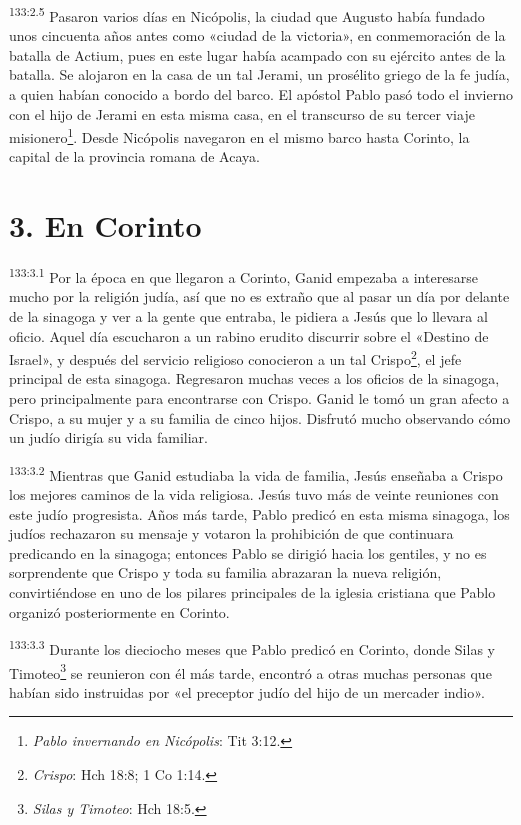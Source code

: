 \par 
\textsuperscript{133:2.5} Pasaron varios días en Nicópolis, la ciudad que Augusto había fundado unos cincuenta años antes como «ciudad de la victoria», en conmemoración de la batalla de Actium, pues en este lugar había acampado con su ejército antes de la batalla. Se alojaron en la casa de un tal Jerami, un prosélito griego de la fe judía, a quien habían conocido a bordo del barco. El apóstol Pablo pasó todo el invierno con el hijo de Jerami en esta misma casa, en el transcurso de su tercer viaje misionero\footnote{\textit{Pablo invernando en Nicópolis}: Tit 3:12.}. Desde Nicópolis navegaron en el mismo barco hasta Corinto, la capital de la provincia romana de Acaya.

\section*{3. En Corinto}
\par 
\textsuperscript{133:3.1} Por la época en que llegaron a Corinto, Ganid empezaba a interesarse mucho por la religión judía, así que no es extraño que al pasar un día por delante de la sinagoga y ver a la gente que entraba, le pidiera a Jesús que lo llevara al oficio. Aquel día escucharon a un rabino erudito discurrir sobre el «Destino de Israel», y después del servicio religioso conocieron a un tal Crispo\footnote{\textit{Crispo}: Hch 18:8; 1 Co 1:14.}, el jefe principal de esta sinagoga. Regresaron muchas veces a los oficios de la sinagoga, pero principalmente para encontrarse con Crispo. Ganid le tomó un gran afecto a Crispo, a su mujer y a su familia de cinco hijos. Disfrutó mucho observando cómo un judío dirigía su vida familiar.

\par 
\textsuperscript{133:3.2} Mientras que Ganid estudiaba la vida de familia, Jesús enseñaba a Crispo los mejores caminos de la vida religiosa. Jesús tuvo más de veinte reuniones con este judío progresista. Años más tarde, Pablo predicó en esta misma sinagoga, los judíos rechazaron su mensaje y votaron la prohibición de que continuara predicando en la sinagoga; entonces Pablo se dirigió hacia los gentiles, y no es sorprendente que Crispo y toda su familia abrazaran la nueva religión, convirtiéndose en uno de los pilares principales de la iglesia cristiana que Pablo organizó posteriormente en Corinto.

\par 
\textsuperscript{133:3.3} Durante los dieciocho meses que Pablo predicó en Corinto, donde Silas y Timoteo\footnote{\textit{Silas y Timoteo}: Hch 18:5.} se reunieron con él más tarde, encontró a otras muchas personas que habían sido instruidas por «el preceptor judío del hijo de un mercader indio».

